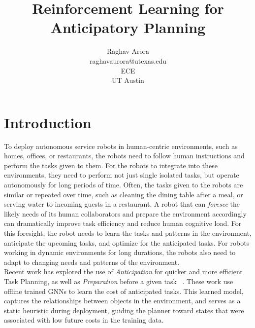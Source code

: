 \documentclass[10pt]{article} %
\title{Reinforcement Learning for Anticipatory Planning}
\author{Raghav Arora \\
    raghavaurora@utexas.edu \\
    ECE \\
    UT Austin}
\begin{document}
\maketitle



\section{Introduction}
\label{sec:introduction}
To deploy autonomous service robots in human-centric environments, such as homes, offices, or restaurants, the robots need to follow human instructions and perform the tasks given to them. For the robots to integrate into these environments, they need to perform not just single isolated tasks, but operate autonomously for long periods of time.
Often, the tasks given to the robots are similar or repeated over time, such as cleaning the dining table after a meal, or serving water to incoming guests in a restaurant. A robot that can \textit{foresee} the likely needs of its human collaborators and prepare the environment accordingly can dramatically improve task efficiency and reduce human cognitive load. 
For this foresight, the robot needs to learn the tasks and patterns in the environment, anticipate the upcoming tasks, and optimize for the anticipated tasks. For robots working in dynamic environments for long durations, the robots also need to adapt to changing needs and patterns of the environment. 
\\
Recent work has explored the use of \textit{Anticipation} for quicker and more efficient Task Planning, as well as \textit{Preparation} before a given task ~\citep{dhakal_anticipatory_2023,dhakal_anticipatory_2024,talukder_anticipatory_2024}. These work use offline trained GNNs to learn the cost of anticipated tasks.
This learned model, captures the relationships between objects in the environment, and serves as a static heuristic during deployment, guiding the planner toward states that were associated with low future costs in the training data.
\end{document}
